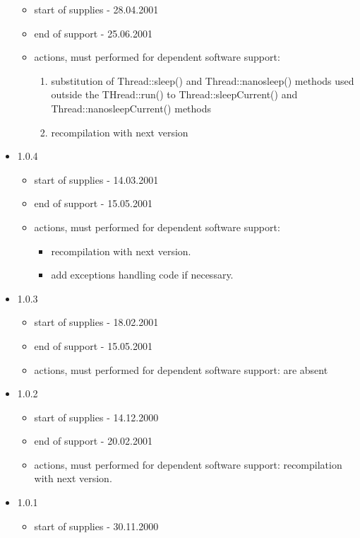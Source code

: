 \documentclass[10pt]{article}
\begin{document}
\begin{itemize}
  \begin{itemize}
   \item start of supplies - 28.04.2001
   \item end of support - 25.06.2001
   \item actions, must performed for dependent software support: 
     \begin{enumerate}
         \item substitution of Thread::sleep() and Thread::nanosleep() methods
               used outside the THread::run() 
               to Thread::sleepCurrent() and Thread::nanosleepCurrent() methods
         \item recompilation with next version
     \end{enumerate}
  \end{itemize}
  \item 1.0.4 
  \begin{itemize}
   \item start of supplies - 14.03.2001
   \item end of support - 15.05.2001
   \item actions, must performed for dependent software support: 
   \begin{itemize}
     \item recompilation with next version.
     \item add exceptions handling code if necessary.
   \end{itemize}
  \end{itemize}
  \item 1.0.3
  \begin{itemize}
   \item start of supplies - 18.02.2001 
   \item end of support - 15.05.2001
   \item actions, must performed for dependent software support: are absent
  \end{itemize}
  \item 1.0.2
  \begin{itemize}
   \item start of supplies - 14.12.2000
   \item end of support -  20.02.2001
   \item actions, must performed for dependent software support: 
        recompilation with next version.
  \end{itemize}
  \item 1.0.1
  \begin{itemize}
   \item start of supplies - 30.11.2000

\end{itemize}
\end{itemize}
\end{document}
